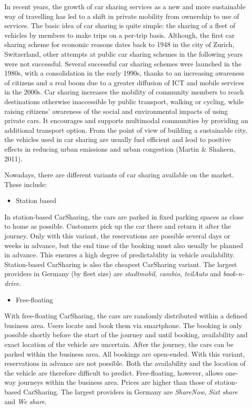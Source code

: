 \documentclass[
]{book}
\providecommand{\tightlist}{%
  \setlength{\itemsep}{0pt}\setlength{\parskip}{0pt}}
\begin{document}
In recent years, the growth of car sharing services as a new and more sustainable way of travelling has led to a shift in private mobility from ownership to use of services. The basic idea of car sharing is quite simple: the sharing of a fleet of vehicles by members to make trips on a per-trip basis. Although, the first car sharing scheme for economic reasons dates back to 1948 in the city of Zurich, Switzerland, other attempts at public car sharing schemes in the following years were not successful. Several successful car sharing schemes were launched in the 1980s, with a consolidation in the early 1990s, thanks to an increasing awareness of citizens and a real boom due to a greater diffusion of ICT and mobile services in the 2000s. Car sharing increases the mobility of community members to reach destinations otherwise inaccessible by public transport, walking or cycling, while raising citizens' awareness of the social and environmental impacts of using private cars. It encourages and supports multimodal communities by providing an additional transport option. From the point of view of building a sustainable city, the vehicles used in car sharing are usually fuel efficient and lead to positive effects in reducing urban emissions and urban congestion (Martin \& Shaheen, 2011).

Nowadays, there are different variants of car sharing available on the market. These include:

\begin{itemize}
\tightlist
\item
  Station based
\end{itemize}

In station-based CarSharing, the cars are parked in fixed parking spaces as close to home as possible. Customers pick up the car there and return it after the journey. Only with this variant, the reservations are possible several days or weeks in advance, but the end time of the booking must also usually be planned in advance. This ensures a high degree of predictability in vehicle availability. Station-based CarSharing is also the cheapest CarSharing variant. The largest providers in Germany (by fleet size) are \emph{stadtmobil, cambio, teilAuto} and \emph{book-n-drive}.

\begin{itemize}
\tightlist
\item
  Free-floating
\end{itemize}

With free-floating CarSharing, the cars are randomly distributed within a defined business area. Users locate and book them via smartphone. The booking is only possible shortly before the start of the journey and until booking, availability and exact location of the vehicle are uncertain. After the journey, the cars can be parked within the business area. All bookings are open-ended. With this variant, reservations in advance are not possible. Both the availability and the location of the vehicle are therefore difficult to predict. Free-floating, however, allows one-way journeys within the business area. Prices are higher than those of station-based CarSharing. The largest providers in Germany are \emph{ShareNow}, \emph{Sixt share} and \emph{We share}.
\end{document}
